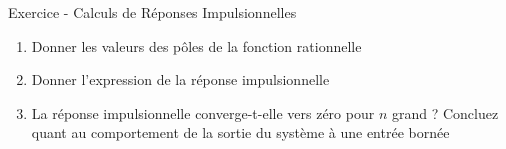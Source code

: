 \documentclass[a4paper,11pt]{beamer}
\newcounter{exampleBlockCounter}
\begin{document}
\begin{frame}
\begin{exampleblock}{Exercice  - Calculs de Réponses
Impulsionnelles}
\begin{enumerate}
  \justifying
  \item Donner les valeurs des pôles de la fonction rationnelle
  \item Donner l'expression de la réponse impulsionnelle
  \item La réponse impulsionnelle converge-t-elle vers zéro pour $n$ grand ?
  Concluez quant au comportement de la sortie du système à une entrée bornée 
\end{enumerate}
\end{exampleblock}
\end{frame}
\end{document}
